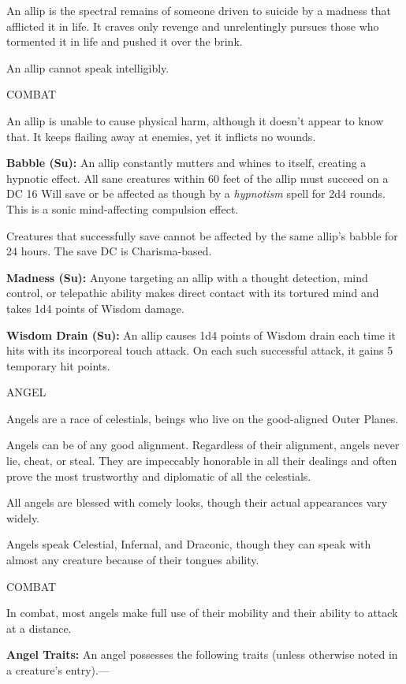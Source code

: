 \documentclass{article}
\begin{document}
An allip is the spectral remains of someone driven to suicide by a madness that 
afflicted it in life. It craves only revenge and unrelentingly pursues those who 
tormented it in life and pushed it over the brink. 

An allip cannot speak intelligibly.

COMBAT

An allip is unable to cause physical harm, although it doesn't appear to know that. 
It keeps flailing away at enemies, yet it inflicts no wounds.

\textbf{Babble (Su):} An allip constantly mutters and whines to itself, creating 
a hypnotic effect. All sane creatures within 60 feet of the allip must succeed 
on a DC 16 Will save or be affected as though by a \textit{hypnotism }spell for 
2d4 rounds. This is a sonic mind-affecting compulsion effect.

Creatures that successfully save cannot be affected by the same allip's babble 
for 24 hours. The save DC is Charisma-based.

\textbf{Madness (Su):} Anyone targeting an allip with a thought detection, mind 
control, or telepathic ability makes direct contact with its tortured mind and 
takes 1d4 points of Wisdom damage.

\textbf{Wisdom Drain (Su): }An allip causes 1d4 points of Wisdom drain each time 
it hits with its incorporeal touch attack. On each such successful attack, it gains 
5 temporary hit points.

\vspace{12pt}
{\LARGE{}ANGEL}

Angels are a race of celestials, beings who live on the good-aligned Outer Planes.

Angels can be of any good alignment. Regardless of their alignment, angels never 
lie, cheat, or steal. They are impeccably honorable in all their dealings and often 
prove the most trustworthy and diplomatic of all the celestials.

All angels are blessed with comely looks, though their actual appearances vary 
widely.

Angels speak Celestial, Infernal, and Draconic, though they can speak with almost 
any creature because of their tongues ability.

COMBAT

In combat, most angels make full use of their mobility and their ability to attack 
at a distance.

\textbf{Angel Traits:} An angel possesses the following traits (unless otherwise 
noted in a creature's entry).---
\end{document}

